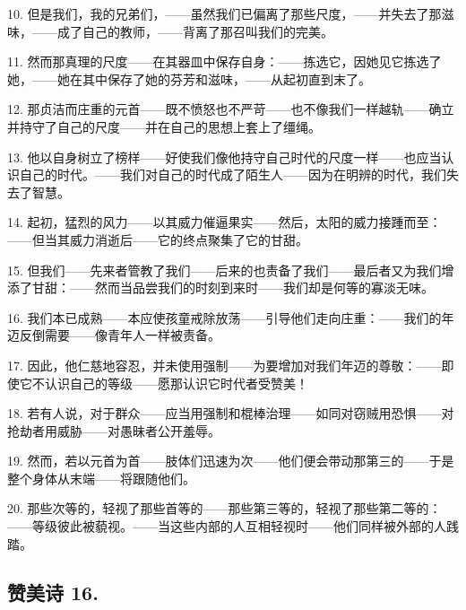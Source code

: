 10. 但是我们，我的兄弟们，——虽然我们已偏离了那些尺度，——并失去了那滋味，——成了自己的教师，——背离了那召叫我们的完美。\par

11. 然而那真理的尺度——在其器皿中保存自身：——拣选它，因她见它拣选了她，——她在其中保存了她的芬芳和滋味，——从起初直到末了。\par

12. 那贞洁而庄重的元首——既不愤怒也不严苛——也不像我们一样越轨——确立并持守了自己的尺度——并在自己的思想上套上了缰绳。\par

13. 他以自身树立了榜样——好使我们像他持守自己时代的尺度一样——也应当认识自己的时代。——我们对自己的时代成了陌生人——因为在明辨的时代，我们失去了智慧。\par

14. 起初，猛烈的风力——以其威力催逼果实——然后，太阳的威力接踵而至：——但当其威力消逝后——它的终点聚集了它的甘甜。\par

15. 但我们——先来者管教了我们——后来的也责备了我们——最后者又为我们增添了甘甜：——然而当品尝我们的时刻到来时——我们却是何等的寡淡无味。\par

16. 我们本已成熟——本应使孩童戒除放荡——引导他们走向庄重：——我们的年迈反倒需要——像青年人一样被责备。\par

17. 因此，他仁慈地容忍，并未使用强制——为要增加对我们年迈的尊敬：——即使它不认识自己的等级——愿那认识它时代者受赞美！\par

18. 若有人说，对于群众——应当用强制和棍棒治理——如同对窃贼用恐惧——对抢劫者用威胁——对愚昧者公开羞辱。\par

19. 然而，若以元首为首——肢体们迅速为次——他们便会带动那第三的——于是整个身体从末端——将跟随他们。\par

20. 那些次等的，轻视了那些首等的——那些第三等的，轻视了那些第二等的：——等级彼此被藐视。——当这些内部的人互相轻视时——他们同样被外部的人践踏。\par


\subsection{赞美诗 16.}

